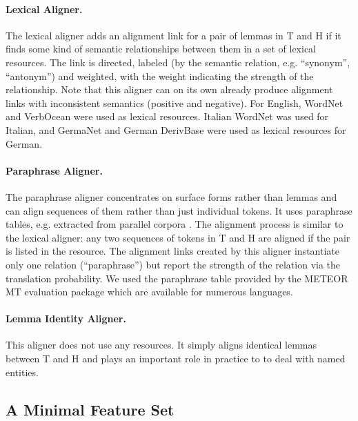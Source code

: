 \documentclass[11pt,letterpaper]{article}
\begin{document}



\paragraph{Lexical Aligner.} The lexical aligner adds an alignment link
for a pair of lemmas in T and H if it finds some kind of semantic
relationships between them in a set of lexical resources. The link is
directed, labeled (by the semantic relation, e.g. ``synonym'',
``antonym'') and weighted, with the weight indicating the strength of
the relationship. Note that this aligner can on its own already
produce alignment links with inconsistent semantics (positive and
negative). For English, WordNet and VerbOcean were used as lexical
resources. Italian WordNet was used for Italian, and GermaNet and
German DerivBase \cite{Zeller:2013} were used as lexical resources for
German.

\paragraph{Paraphrase Aligner.} The paraphrase aligner concentrates on
surface forms rather than lemmas and can align sequences of them
rather than just individual tokens. It uses paraphrase tables, e.g.
extracted from parallel corpora
\cite{bannard05:_parap_bilin_paral_corpor}. The alignment process is
similar to the lexical aligner: any two sequences of tokens in T and H
are aligned if the pair is listed in the resource.  The alignment
links created by this aligner instantiate only one relation
(``paraphrase'') but report the strength of the relation via the
translation probability. We used the paraphrase table provided by the
METEOR MT evaluation package \cite{denkowski-lavie:2014:W14-33} which
are available for numerous languages.

\paragraph{Lemma Identity Aligner.} This aligner does not use any
resources. It simply aligns identical lemmas between T and H and plays
an important role in practice to to deal with named entities.



\subsection{A Minimal Feature Set} 
\end{document}

